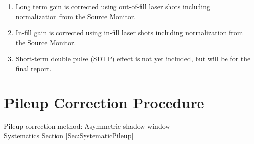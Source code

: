 	\begin{enumerate}
		\item{Long term gain is corrected using out-of-fill laser shots including normalization from the Source Monitor.}
		\item{In-fill gain is corrected using in-fill laser shots including normalization from the Source Monitor.}
		\item{Short-term double pulse (SDTP) effect is not yet included, but will be for the final report.}
	\end{enumerate}


\section{Pileup Correction Procedure}
\label{Sec:PileupCorrection}

	Pileup correction method: Asymmetric shadow window \\
	\noindent Systematics Section \ref{Sec:SystematicPileup}

